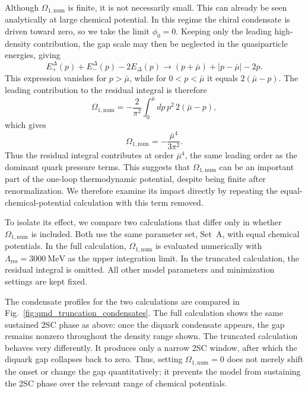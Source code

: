 Although \(\Omega_{1,\mathrm{num}}\) is finite, it is not necessarily
small. This can already be seen analytically at large chemical
potential. In this regime the chiral condensate is driven toward zero,
so we take the limit \(\phi_0=0\). Keeping only the leading
high-density contribution, the gap scale may then be neglected in the
quasiparticle energies, giving
\begin{equation}
E^\Delta_+(p)+E^\Delta_-(p)-2E_\Delta(p)
\longrightarrow
(p+\bar{\mu})+|p-\bar{\mu}|-2p .
\end{equation}
This expression vanishes for \(p>\bar{\mu}\), while for
\(0<p<\bar{\mu}\) it equals \(2(\bar{\mu}-p)\). The leading contribution
to the residual integral is therefore
\begin{equation}
\Omega_{1,\mathrm{num}}
=
-\frac{2}{\pi^2}
\int_0^{\bar{\mu}} dp\,p^2\,2(\bar{\mu}-p),
\end{equation}
which gives
\begin{equation}
\Omega_{1,\mathrm{num}}
=
-\frac{\bar{\mu}^4}{3\pi^2}.
\end{equation}
Thus the residual integral contributes at order \(\bar{\mu}^4\), the
same leading order as the dominant quark pressure terms. This suggests
that \(\Omega_{1,\mathrm{num}}\) can be an important part of the
one-loop thermodynamic potential, despite being finite after
renormalization. We therefore examine its impact directly by repeating
the equal-chemical-potential calculation with this term removed.

To isolate its effect, we compare two calculations that differ only in
whether \(\Omega_{1,\mathrm{num}}\) is included. Both use the same
parameter set, Set~A, with equal chemical potentials.
In the full calculation,
\(\Omega_{1,\mathrm{num}}\) is evaluated numerically with
\(\Lambda_\mathrm{res}=3000~\mathrm{MeV}\) as the upper integration
limit. In the truncated calculation, the residual integral is omitted.
All other model parameters and minimization settings are kept fixed.

The condensate profiles for the two calculations are compared in
Fig.~\ref{fig:qmd_truncation_condensates}. The full calculation shows
the same sustained 2SC phase as above: once the
diquark condensate appears, the gap remains nonzero throughout the
density range shown. The truncated calculation behaves very differently.
It produces only a narrow 2SC window, after which the diquark gap
collapses back to zero. Thus, setting
\(\Omega_{1,\mathrm{num}}=0\) does not merely shift the onset or change
the gap quantitatively; it prevents the model from sustaining the 2SC
phase over the relevant range of chemical potentials.

